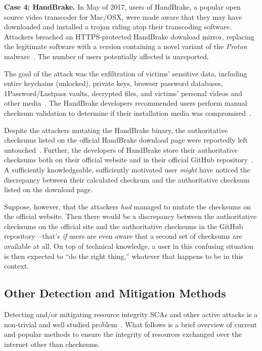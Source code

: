 \noindent\textbf{Case 4: HandBrake.} In May of 2017, users of HandBrake, a
popular open source video transcoder for Mac/OSX, were made aware that they may
have downloaded and installed a trojan riding atop their transcoding software.
Attackers breached an HTTPS-protected HandBrake download mirror, replacing the
legitimate software with a version containing a novel variant of the
\emph{Proton} malware~\cite{SCA-HB1}. The number of users potentially affected
is unreported.

The goal of the attack was the exfiltration of victims' sensitive data,
including entire keychains (unlocked), private keys, browser password databases,
1Password/Lastpass vaults, decrypted files, and victims' personal videos and
other media~\cite{SCA-HB1}. The HandBrake developers recommended users perform
manual checksum validation to determine if their installation media was
compromised~\cite{SCA-HB2}.

Despite the attackers mutating the HandBrake binary, the authoritative checksums
listed on the official HandBrake download page were reportedly left
untouched~\cite{SCA-HB2}. Further, the developers of HandBrake store their
authoritative checksums both on their official website and in their official
GitHub repository~\cite{SCA-HB2}. A sufficiently knowledgeable, sufficiently
motivated user \emph{might} have noticed the discrepancy between their
calculated checksum and the authoritative checksum listed on the download page.

Suppose, however, that the attackers \textit{had} managed to mutate the
checksums on the official website. Then there would be a discrepancy between the
authoritative checksums on the official site and the authoritative checksums in
the GitHub repository---that's \emph{if} users are even aware that a second set
of checksums are available at all. On top of technical knowledge, a user in this
confusing situation is then expected to ``do the right thing,'' whatever that
happens to be in this context.

\subsection{Other Detection and Mitigation Methods}

Detecting and/or mitigating resource integrity SCAs and other active attacks is
a non-trivial and well studied problem~\cite{MD5Header, HTTP1.1, HTTPS, SRI, LF,
OpenPGP1, DNSSEC, PKI}. What follows is a brief overview of current and popular
methods to ensure the integrity of resources exchanged over the internet other
than checksums.

